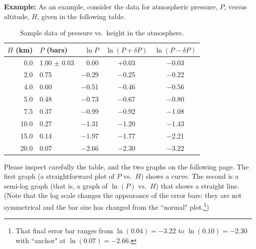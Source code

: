 {\bf Example: }
As an example, consider the data for atmospheric pressure, $P$,
versus altitude, $H$, given in the following table.

\begin{table}[h]
\begin{center}
\begin{tabular}{|rlrcc|}
\hline
$H$ (km) & $P$ (bars) & $\ln P$ & $\ln (P + \delta P)$ & $\ln (P - \delta P)$ \\
 \hline
0.0 \hspace{6pt}  & 1.00 $\pm$ 0.03 & 0.00    & +0.03     &  $-$0.03\\
2.0 \hspace{6pt}  & 0.75            & $-$0.29 & $-$0.25   &  $-$0.22 \\
4.0 \hspace{6pt}  &     0.60        & $-$0.51 &   $-$0.46 &  $-$0.56 \\
5.0 \hspace{6pt}  &     0.48        & $-$0.73 &   $-$0.67 &  $-$0.80 \\
7.5 \hspace{6pt}  &   0.37          & $-$0.99 &   $-$0.92 &  $-$1.08  \\
10.0 \hspace{6pt} &   0.27          & $-$1.31 &   $-$1.20 &  $-$1.43 \\
15.0 \hspace{6pt} &     0.14        & $-$1.97 &   $-$1.77 &  $-$2.21 \\
20.0 \hspace{6pt} &     0.07        & $-$2.66 &   $-$2.30 &  $-$3.22 \\
\hline
\end{tabular}
\end{center}
\caption{Sample data of pressure vs.\ height in the atmosphere.
     \label{table:pressure}}
\end{table}

Please inspect carefully the table, and the two graphs on the following
page.  The first graph (a straightforward plot of $P$ vs.\ $H$)
shows a curve.  The second is a semi-log graph (that
is, a graph of $\ln(P)$ vs.\ $H$) that shows a straight line.  
(Note that the log scale
changes the appearance of the error bars: they are not symmetrical
and the bar size has changed from the ``normal" plot.\footnote{That final error bar
ranges from $\ln(0.04)=-3.22$ to $\ln(0.10)=-2.30$ with ``anchor" at $\ln(0.07)=-2.66$.})  

